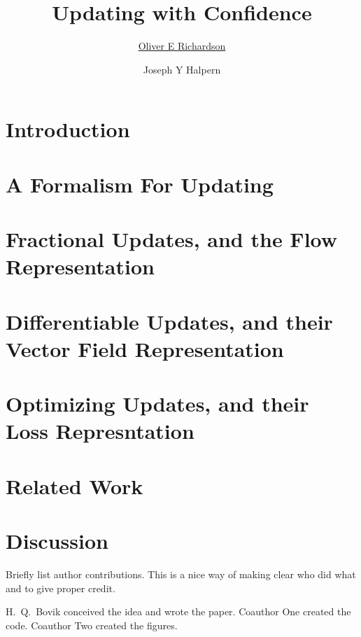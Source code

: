 \documentclass{uai2022} %
\title{Updating with Confidence}
\author[1]{\href{mailto:<oer5@cornell.edu>?Subject=Confidence}{Oliver E Richardson}{}}
\author[1]{Joseph Y Halpern}
\affil[1]{%
    Computer Science Dept.\\
    Cornell University\\
    Ithaca, New York, USA
}
\begin{document}
\maketitle

\begin{abstract}

\end{abstract}

\section{Introduction}\label{sec:intro}


\section{A Formalism For Updating}


\section{Fractional Updates, and the
    Flow Representation}


\section{Differentiable Updates, and their
    Vector Field Representation}


\section{Optimizing Updates, and their
    Loss Represntation}


\section{Related Work}
\section{Discussion}


\begin{contributions} %
    Briefly list author contributions.
    This is a nice way of making clear who did what and to give proper credit.

    H.~Q.~Bovik conceived the idea and wrote the paper.
    Coauthor One created the code.
    Coauthor Two created the figures.
\end{contributions}
\end{document}
